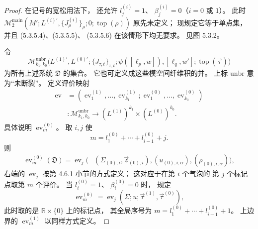 \begin{proof}
在记号的宽松用法下，
还允许 $l_j^{(i)}=1$、
$\beta_j^{(i)}=0$（$i=0$ 或 $1$）。
此时
$\mathcal M^{\mathrm{main}}_2
(M';L^{(i)\prime},
  \{J^{(i)}_\rho\}_\rho;
  0;\operatorname{top}(\rho))$
原先未定义；
现规定它等于单点集，
并且 (5.3.5.4)、(5.3.5.5)、
(5.3.5.6) 在该情形下均无要求。
见图 5.3.2。

令
\[
\mathcal M^{\mathrm{unbr}}_{k_1,k_0}
\bigl(
 L^{(1)\prime},L^{(0)\prime};
 \{J_{\tau,t}\}_{\tau,t};
 \psi([\ell_p,w]),[\ell_q,w'];
 \operatorname{top}(\vec\tau)
\bigr)
\]
为所有上述系统 $\mathfrak D$ 的集合。
它也可定义成这些模空间纤维积的并。
上标 $\mathrm{unbr}$ 意为“未断裂”。
定义评价映射
\[
\begin{aligned}
\operatorname{ev}
&=(\operatorname{ev}^{(1)}_1,\ldots,
  \operatorname{ev}^{(1)}_{k_1};
  \operatorname{ev}^{(0)}_1,\ldots,
  \operatorname{ev}^{(0)}_{k_0})
\\
&\colon
\mathcal M^{\mathrm{unbr}}_{k_1,k_0}
\longrightarrow
(L^{(1)})^{k_1}\times
(L^{(0)})^{k_0}.
\end{aligned}
\]
具体说明
$\operatorname{ev}^{(0)}_m$。
取 $i,j$ 使
\[
m=l_1^{(0)}+\cdots+l_{i-1}^{(0)}+j.
\]
则
\[
\begin{aligned}
\operatorname{ev}^{(0)}_m(\mathfrak D)
=\operatorname{ev}_j\bigl(
 &(\Sigma_{(0),i},\vec z_{(0),i}),
 (u_{(0),i,\alpha}),
 (\rho_{(0),i,\alpha})
\bigr),
\end{aligned}
\]
右端的 $\operatorname{ev}_j$
按第 4.6.1 小节的方式定义；
这对应于在第 $i$ 个气泡的
第 $j$ 个标记点取第 $m$ 个评价。
当 $l_i^{(0)}=1$、
$\beta_i^{(0)}=0$ 时，
规定
\[
\operatorname{ev}^{(0)}_m
=\operatorname{ev}_j
(\Sigma;u;\vec\tau^{(1)},\vec\tau^{(0)}),
\]
此时取的是
$\mathbb R\times\{0\}$
上的标记点，
其全局序号为
$m=l_1^{(0)}+\cdots+l_{i-1}^{(0)}+1$。
上边界的
$\operatorname{ev}^{(1)}_m$
以同样方式定义。


\end{proof}
